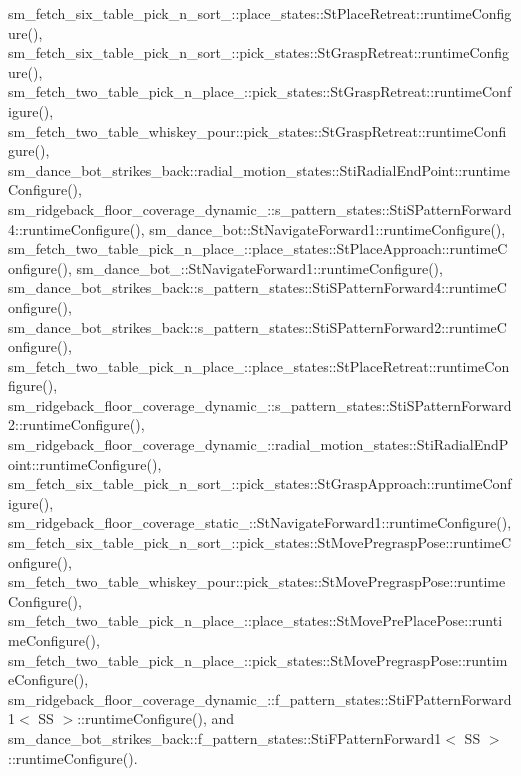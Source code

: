 sm\+\_\+fetch\+\_\+six\+\_\+table\+\_\+pick\+\_\+n\+\_\+sort\+\_\+::place\+\_\+states\+::\+St\+Place\+Retreat\+::runtime\+Configure(), sm\+\_\+fetch\+\_\+six\+\_\+table\+\_\+pick\+\_\+n\+\_\+sort\+\_\+::pick\+\_\+states\+::\+St\+Grasp\+Retreat\+::runtime\+Configure(), sm\+\_\+fetch\+\_\+two\+\_\+table\+\_\+pick\+\_\+n\+\_\+place\+\_\+::pick\+\_\+states\+::\+St\+Grasp\+Retreat\+::runtime\+Configure(), sm\+\_\+fetch\+\_\+two\+\_\+table\+\_\+whiskey\+\_\+pour\+::pick\+\_\+states\+::\+St\+Grasp\+Retreat\+::runtime\+Configure(), sm\+\_\+dance\+\_\+bot\+\_\+strikes\+\_\+back\+::radial\+\_\+motion\+\_\+states\+::\+Sti\+Radial\+End\+Point\+::runtime\+Configure(), sm\+\_\+ridgeback\+\_\+floor\+\_\+coverage\+\_\+dynamic\+\_\+::s\+\_\+pattern\+\_\+states\+::\+Sti\+S\+Pattern\+Forward4\+::runtime\+Configure(), sm\+\_\+dance\+\_\+bot\+::\+St\+Navigate\+Forward1\+::runtime\+Configure(), sm\+\_\+fetch\+\_\+two\+\_\+table\+\_\+pick\+\_\+n\+\_\+place\+\_\+::place\+\_\+states\+::\+St\+Place\+Approach\+::runtime\+Configure(), sm\+\_\+dance\+\_\+bot\+\_\+::\+St\+Navigate\+Forward1\+::runtime\+Configure(), sm\+\_\+dance\+\_\+bot\+\_\+strikes\+\_\+back\+::s\+\_\+pattern\+\_\+states\+::\+Sti\+S\+Pattern\+Forward4\+::runtime\+Configure(), sm\+\_\+dance\+\_\+bot\+\_\+strikes\+\_\+back\+::s\+\_\+pattern\+\_\+states\+::\+Sti\+S\+Pattern\+Forward2\+::runtime\+Configure(), sm\+\_\+fetch\+\_\+two\+\_\+table\+\_\+pick\+\_\+n\+\_\+place\+\_\+::place\+\_\+states\+::\+St\+Place\+Retreat\+::runtime\+Configure(), sm\+\_\+ridgeback\+\_\+floor\+\_\+coverage\+\_\+dynamic\+\_\+::s\+\_\+pattern\+\_\+states\+::\+Sti\+S\+Pattern\+Forward2\+::runtime\+Configure(), sm\+\_\+ridgeback\+\_\+floor\+\_\+coverage\+\_\+dynamic\+\_\+::radial\+\_\+motion\+\_\+states\+::\+Sti\+Radial\+End\+Point\+::runtime\+Configure(), sm\+\_\+fetch\+\_\+six\+\_\+table\+\_\+pick\+\_\+n\+\_\+sort\+\_\+::pick\+\_\+states\+::\+St\+Grasp\+Approach\+::runtime\+Configure(), sm\+\_\+ridgeback\+\_\+floor\+\_\+coverage\+\_\+static\+\_\+::\+St\+Navigate\+Forward1\+::runtime\+Configure(), sm\+\_\+fetch\+\_\+six\+\_\+table\+\_\+pick\+\_\+n\+\_\+sort\+\_\+::pick\+\_\+states\+::\+St\+Move\+Pregrasp\+Pose\+::runtime\+Configure(), sm\+\_\+fetch\+\_\+two\+\_\+table\+\_\+whiskey\+\_\+pour\+::pick\+\_\+states\+::\+St\+Move\+Pregrasp\+Pose\+::runtime\+Configure(), sm\+\_\+fetch\+\_\+two\+\_\+table\+\_\+pick\+\_\+n\+\_\+place\+\_\+::place\+\_\+states\+::\+St\+Move\+Pre\+Place\+Pose\+::runtime\+Configure(), sm\+\_\+fetch\+\_\+two\+\_\+table\+\_\+pick\+\_\+n\+\_\+place\+\_\+::pick\+\_\+states\+::\+St\+Move\+Pregrasp\+Pose\+::runtime\+Configure(), sm\+\_\+ridgeback\+\_\+floor\+\_\+coverage\+\_\+dynamic\+\_\+::f\+\_\+pattern\+\_\+states\+::\+Sti\+F\+Pattern\+Forward1$<$ S\+S $>$\+::runtime\+Configure(), and sm\+\_\+dance\+\_\+bot\+\_\+strikes\+\_\+back\+::f\+\_\+pattern\+\_\+states\+::\+Sti\+F\+Pattern\+Forward1$<$ S\+S $>$\+::runtime\+Configure().


